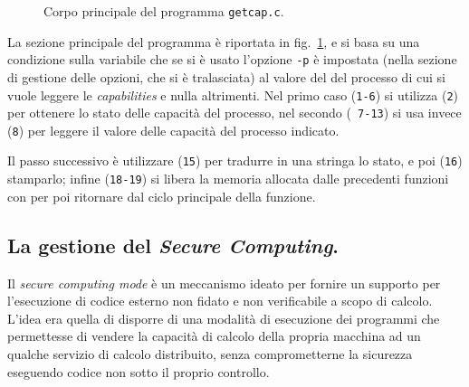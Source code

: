 \begin{figure}[!htbp]
  \footnotesize \centering
  \begin{minipage}[c]{\codesamplewidth}
  \end{minipage} 
  \normalsize
  \caption{Corpo principale del programma \texttt{getcap.c}.}
  \label{fig:proc_getcap}
\end{figure}

La sezione principale del programma è riportata in fig.~\ref{fig:proc_getcap},
e si basa su una condizione sulla variabile  che se si è usato
l'opzione \texttt{-p} è impostata (nella sezione di gestione delle opzioni,
che si è tralasciata) al valore del  del processo di cui si vuole
leggere le \textit{capabilities} e nulla altrimenti. Nel primo caso
(\texttt{\small 1-6}) si utilizza (\texttt{\small 2}) 
per ottenere lo stato delle capacità del processo, nel secondo (\texttt{\small
  7-13}) si usa invece  (\texttt{\small 8}) per leggere
il valore delle capacità del processo indicato.

Il passo successivo è utilizzare (\texttt{\small 15})  per
tradurre in una stringa lo stato, e poi (\texttt{\small 16}) stamparlo; infine
(\texttt{\small 18-19}) si libera la memoria allocata dalle precedenti
funzioni con  per poi ritornare dal ciclo principale della
funzione.






\subsection{La gestione del \textit{Secure Computing}.}
\label{sec:procadv_seccomp}


Il \textit{secure computing mode} è un meccanismo ideato per fornire un
supporto per l'esecuzione di codice esterno non fidato e non verificabile a
scopo di calcolo. L'idea era quella di disporre di una modalità di esecuzione
dei programmi che permettesse di vendere la capacità di calcolo della propria
macchina ad un qualche servizio di calcolo distribuito, senza comprometterne
la sicurezza eseguendo codice non sotto il proprio controllo.

